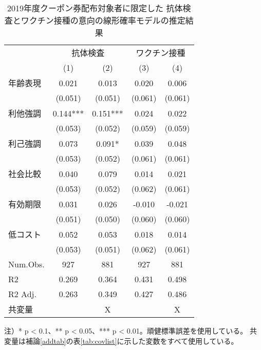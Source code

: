\documentclass[
  11pt,
  a4paper,
]{article}
\begin{document}
\begin{table}

\caption{\label{tab:show-int-coupon1-reg}2019年度クーポン券配布対象者に限定した 抗体検査とワクチン接種の意向の線形確率モデルの推定結果}
\centering
\begin{threeparttable}
\begin{tabular}[t]{lcccc}
\toprule
\multicolumn{1}{c}{ } & \multicolumn{2}{c}{抗体検査} & \multicolumn{2}{c}{ワクチン接種} \\
\cmidrule(l{3pt}r{3pt}){2-3} \cmidrule(l{3pt}r{3pt}){4-5}
  & (1) & (2) & (3) & (4)\\
\midrule
年齢表現 & 0.021 & 0.013 & 0.020 & 0.006\\
 & (0.051) & (0.051) & (0.061) & (0.061)\\
利他強調 & 0.144*** & 0.151*** & 0.024 & 0.022\\
 & (0.053) & (0.052) & (0.059) & (0.059)\\
利己強調 & 0.073 & 0.091* & 0.039 & 0.048\\
 & (0.053) & (0.052) & (0.061) & (0.061)\\
社会比較 & 0.040 & 0.079 & 0.014 & 0.021\\
 & (0.053) & (0.052) & (0.062) & (0.061)\\
有効期限 & 0.031 & 0.026 & -0.010 & -0.021\\
 & (0.051) & (0.050) & (0.060) & (0.060)\\
低コスト & 0.052 & 0.053 & 0.018 & 0.014\\
 & (0.053) & (0.051) & (0.062) & (0.061)\\
\midrule
Num.Obs. & 927 & 881 & 927 & 881\\
R2 & 0.269 & 0.364 & 0.431 & 0.498\\
R2 Adj. & 0.263 & 0.349 & 0.427 & 0.486\\
共変量 &  & X &  & X\\
\bottomrule
\end{tabular}
\begin{tablenotes}
\item 注）* p < 0.1、** p < 0.05、*** p < 0.01。頑健標準誤差を使用している。 共変量は補論\ref{addtab}の表\ref{tab:covlist}に示した変数をすべて使用している。
\end{tablenotes}
\end{threeparttable}
\end{table}
\end{document}
